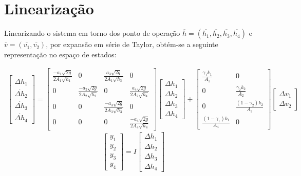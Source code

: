 \section{Linearização}
Linearizando o sistema em torno dos ponto de operação $\overline{h}=(\overline{h_{1}},\overline{h_{2}},\overline{h_{3}},\overline{h_{4}})$ e $\overline{v}=(\overline{v_{1}},\overline{v_{2}})$, por expansão em série de Taylor, obtém-se a seguinte representação no espaço de estados:

\begin{multline} \label{eqModLinear}
	\begin{bmatrix}
		\dot{\Delta h_{1}} \\
		\dot{\Delta h_{2}} \\
		\dot{\Delta h_{3}} \\
		\dot{\Delta h_{4}} 
	\end{bmatrix}
	= 
	\begin{bmatrix}
		\frac{-a_{1}\sqrt{2g}}{2A_{1}\sqrt{h_{1}}} & 0 & \frac{a_{3}\sqrt{2g}}{2A_{1}\sqrt{h_{3}}} & 0 \\
		0 & \frac{-a_{2}\sqrt{2g}}{2A_{2}\sqrt{h_{2}}} & 0 & \frac{a_{4}\sqrt{2g}}{2A_{2}\sqrt{h_{4}}} \\
		0 & 0 & \frac{-a_{3}\sqrt{2g}}{2A_{3}\sqrt{h_{3}}} & 0 \\
		0 & 0 & 0 & \frac{-a_{4}\sqrt{2g}}{2A_{4}\sqrt{h_{4}}}
	\end{bmatrix}
	\begin{bmatrix}
		\Delta h_{1} \\
		\Delta h_{2} \\
		\Delta h_{3} \\
		\Delta h_{4} 
	\end{bmatrix}
	+
	\begin{bmatrix}
		\frac{\gamma_{1}k_{1}}{A_{1}} & 0 \\
		0 & \frac{\gamma_{2}k_{2}}{A_{2}} \\
		0 & \frac{(1-\gamma_{2}) k_{2}}{A_{3}} \\
		\frac{(1-\gamma_{1})k_{1}}{A_{4}} & 0
	\end{bmatrix}
	\begin{bmatrix}
		\Delta v_{1} \\
		\Delta v_{2}
	\end{bmatrix}
\end{multline}
\begin{equation}
	\begin{bmatrix}
		y_{1} \\
		y_{2} \\
		y_{3} \\
		y_{4} 
	\end{bmatrix}
	= 
	I
	\begin{bmatrix}
		\Delta h_{1} \\
		\Delta h_{2} \\
		\Delta h_{3} \\
		\Delta h_{4} 
	\end{bmatrix}
	\label{eq3}
\end{equation}

